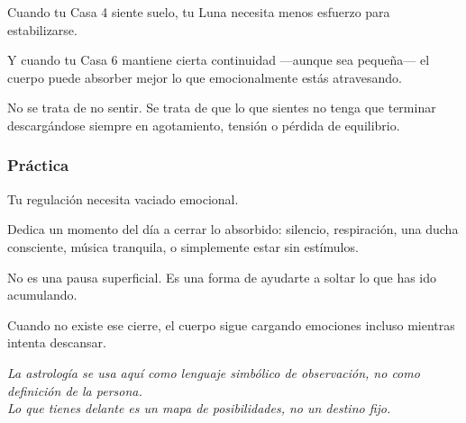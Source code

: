 \documentclass[11pt,a4paper]{article}
\begin{document}
Cuando tu Casa 4 siente suelo, tu Luna necesita menos esfuerzo para estabilizarse.

Y cuando tu Casa 6 mantiene cierta continuidad —aunque sea pequeña— el cuerpo puede absorber mejor lo que emocionalmente estás atravesando.

No se trata de no sentir.
Se trata de que lo que sientes no tenga que terminar descargándose siempre en agotamiento, tensión o pérdida de equilibrio.

\subsubsection*{Práctica}

Tu regulación necesita vaciado emocional.

Dedica un momento del día a cerrar lo absorbido:
silencio,
respiración,
una ducha consciente,
música tranquila,
o simplemente estar sin estímulos.

No es una pausa superficial.
Es una forma de ayudarte a soltar lo que has ido acumulando.

Cuando no existe ese cierre, el cuerpo sigue cargando emociones incluso mientras intenta descansar.

\vspace{0.6cm}

\begin{center}
{\small\itshape\color{grisai}
La astrología se usa aquí como lenguaje simbólico de observación, no como definición de la persona.\\
Lo que tienes delante es un mapa de posibilidades, no un destino fijo.
}
\end{center}
\end{document}
